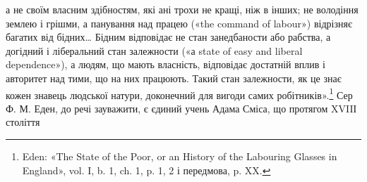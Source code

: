 \parcont{}  %
а не своїм власним здібностям, які ані трохи не кращі, ніж в
інших; не володіння землею і грішми, а панування над працею
(«the command of labour») відрізняє багатих від бідних\dots{} Бідним
відповідає не стан занедбаности або рабства, а догідний і
ліберальний стан залежности («а state of easy and liberal dependence»),
а людям, що мають власність, відповідає достатній вплив
і авторитет над тими, що на них працюють. Такий стан залежности,
як це знає кожен знавець людської натури, доконечний
для вигоди самих робітників».\footnote{
Eden: «The State of the Poor, or an History of the Labouring Glasses
in England», vol. I, b. 1, ch. 1, p. 1, 2 і передмова, p. XX.
} Сер Ф. М. Еден, до речі зауважити,
є єдиний учень Адама Сміса, що протягом XVIIІ століття
